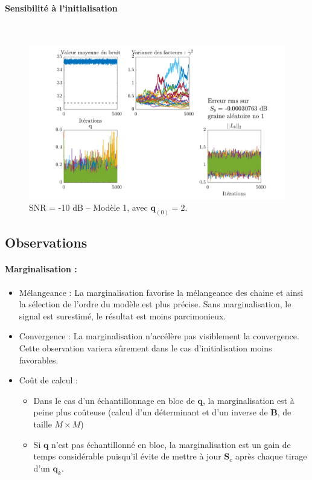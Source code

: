 \documentclass[ 12pt]{article}
\begin{document}
\paragraph{Sensibilité à l’initialisation} ~\\
\begin{figure}[H]
	\centering
	\includegraphics[width=\textwidth]{ToyCase/modele1_ini2_snrm10db.png}	
	\caption{SNR = -10 dB  -- Modèle 1, avec $\bm{q}_{(0)}=2$.}
\end{figure}




\subsection{Observations}
\paragraph{Marginalisation :} 
\begin{itemize}
	\item Mélangeance : La marginalisation favorise la mélangeance des chaine et ainsi la sélection de l'ordre du modèle est plus précise. Sans marginalisation, le signal est surestimé, le résultat est moins parcimonieux.
	\item Convergence : La marginalisation n'accélère pas visiblement la convergence. Cette observation  variera sûrement dans le cas d'initialisation moins favorables. 
        \item Coût de calcul : 
        \begin{itemize}
	        \item Dans le cas d'un échantillonnage en bloc de $\bm{q}$, la marginalisation est à peine plus coûteuse (calcul d'un déterminant et d'un inverse de $\bm{B}$, de taille $M\times M$) 
		\item Si $\bm{q}$ n'est pas échantillonné en bloc, la marginalisation est un gain de temps considérable puisqu'il évite de mettre à jour $\bm{S}_c$ après chaque tirage d'un $\bm{q}_k$.
	\end{itemize}       
\end{itemize}
\end{document}
